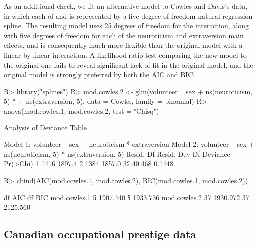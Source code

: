 \documentclass[article]{jss}
\begin{document}
As an additional check, we fit an alternative model to Cowles and
Davis's data, in which each of  and
 is represented by a five-degree-of-freedom natural
regression spline. The resulting model uses 25 degrees of freedom for
the interaction, along with five degrees of freedom for each of the
neuroticism and extraversion main effects, and is consequently much
more flexible than the original model with a linear-by-linear
interaction. A likelihood-ratio test comparing the new model to the
original one fails to reveal significant lack of fit in the original
model, and the original model is strongly preferred by both the AIC
and BIC:
%
\begin{Schunk}
\begin{Sinput}
R> library("splines")
R> mod.cowles.2 <- glm(volunteer ~ sex + ns(neuroticism, 5) * 
+    ns(extraversion, 5), data = Cowles, family = binomial)
R> anova(mod.cowles.1, mod.cowles.2, test = "Chisq")
\end{Sinput}
\begin{Soutput}
Analysis of Deviance Table

Model 1: volunteer ~ sex + neuroticism * extraversion
Model 2: volunteer ~ sex + ns(neuroticism, 5) * ns(extraversion, 5)
  Resid. Df Resid. Dev Df Deviance Pr(>Chi)
1      1416     1897.4                     
2      1384     1857.0 32   40.468   0.1448
\end{Soutput}
\begin{Sinput}
R> cbind(AIC(mod.cowles.1, mod.cowles.2), BIC(mod.cowles.1, mod.cowles.2))
\end{Sinput}
\begin{Soutput}
             df      AIC df      BIC
mod.cowles.1  5 1907.440  5 1933.736
mod.cowles.2 37 1930.972 37 2125.560
\end{Soutput}
\end{Schunk}
%
\subsection{Canadian occupational prestige data}\label{sec-prestige-data}
\end{document}
